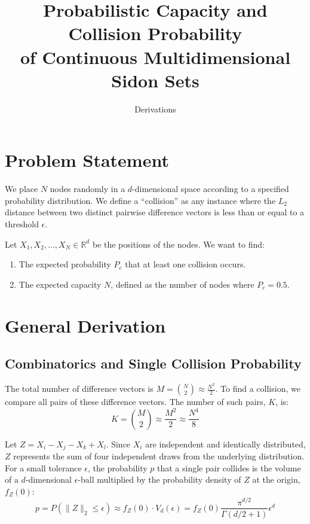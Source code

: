 \documentclass[12pt]{article}
\title{Probabilistic Capacity and Collision Probability \\ of Continuous Multidimensional Sidon Sets}
\author{Derivations}
\date{}
\begin{document}
\maketitle

\section{Problem Statement}
We place $N$ nodes randomly in a $d$-dimensional space according to a specified probability distribution. We define a ``collision'' as any instance where the $L_2$ distance between two distinct pairwise difference vectors is less than or equal to a threshold $\epsilon$. 

Let $X_1, X_2, \dots, X_N \in \mathbb{R}^d$ be the positions of the nodes. We want to find:
\begin{enumerate}
    \item The expected probability $P_c$ that at least one collision occurs.
    \item The expected capacity $N$, defined as the number of nodes where $P_c = 0.5$.
\end{enumerate}

\section{General Derivation}
\subsection{Combinatorics and Single Collision Probability}
The total number of difference vectors is $M = \binom{N}{2} \approx \frac{N^2}{2}$. 
To find a collision, we compare all pairs of these difference vectors. The number of such pairs, $K$, is:
\begin{equation}
    K = \binom{M}{2} \approx \frac{M^2}{2} \approx \frac{N^4}{8}
\end{equation}

Let $Z = X_i - X_j - X_k + X_l$. Since $X_i$ are independent and identically distributed, $Z$ represents the sum of four independent draws from the underlying distribution. 
For a small tolerance $\epsilon$, the probability $p$ that a single pair collides is the volume of a $d$-dimensional $\epsilon$-ball multiplied by the probability density of $Z$ at the origin, $f_Z(0)$:
\begin{equation}
    p = P(\|Z\|_2 \le \epsilon) \approx f_Z(0) \cdot V_d(\epsilon) = f_Z(0) \frac{\pi^{d/2}}{\Gamma(d/2 + 1)} \epsilon^d
\end{equation}
\end{document}
